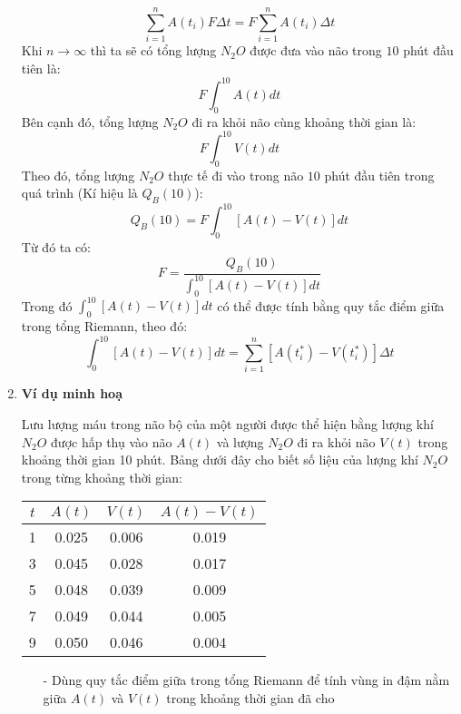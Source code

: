 \documentclass[12pt,a4paper]{article}
\begin{document}
\begin{enumerate}[a/]
\begin{flushleft}
		      $$\sum_{i = 1}^{n} A(t_i)F\Delta t = F \sum_{i = 1}^{n} A(t_i) \Delta t$$
		      Khi $n \to \infty$ thì ta sẽ có tổng lượng $N_2O$ được đưa vào não trong $10$ phút đầu tiên là:
		      $$F \int_{0}^{10} A(t)dt$$
		      Bên cạnh đó, tổng lượng $N_2O$ đi ra khỏi não cùng khoảng thời gian là:
		      $$F \int_{0}^{10} V(t)dt$$
		      Theo đó, tổng lượng $N_2O$ thực tế đi vào trong não $10$ phút đầu tiên trong quá trình (Kí hiệu là $Q_B(10)$):
		      $$Q_B(10)=F\int_{0}^{10}\left[A(t)-V(t)\right]dt$$
		      Từ đó ta có:
		      $$F=\frac{Q_B(10)}{\displaystyle \int_{0}^{10}\left[A(t) - V(t)\right]dt}$$
		      Trong đó $\displaystyle \int_{0}^{10}\left[A(t) - V(t)\right]dt$ có thể được tính bằng quy tắc điểm giữa trong tổng Riemann, theo đó:
		      $$\displaystyle \int_{0}^{10}\left[A(t) - V(t)\right]dt = \sum_{i = 1}^{n} \left[A(t_i^*)-V(t_i^*)\right] \Delta t$$
	      \end{flushleft}
	\item \textbf{Ví dụ minh hoạ}
	      \begin{flushleft}
		      Lưu lượng máu trong não bộ của một người được thể hiện bằng lượng khí $N_2O$ được hấp thụ vào não $A(t)$ và lượng $N_2O$ đi ra khỏi não $V(t)$ trong khoảng thời gian 10 phút.
		      Bảng dưới đây cho biết số liệu của lượng khí $N_2O$ trong từng khoảng thời gian:
	      \end{flushleft}
	      \begin{table}[H]
		      \centering
		      \def\arraystretch{1.2}
		      \begin{tabular}{|c|c|c|c|}
			      \hline
			      $t$ & $A(t)$ & $V(t)$ & $A(t) - V(t)$ \\
			      \hline
			      1   & 0.025  & 0.006  & 0.019         \\
			      \hline
			      3   & 0.045  & 0.028  & 0.017         \\
			      \hline
			      5   & 0.048  & 0.039  & 0.009         \\
			      \hline
			      7   & 0.049  & 0.044  & 0.005         \\
			      \hline
			      9   & 0.050  & 0.046  & 0.004         \\
			      \hline
		      \end{tabular}
	      \end{table}
	      \begin{itemize}
		      \item[-] Dùng quy tắc điểm giữa trong tổng Riemann để tính vùng in đậm nằm giữa $A(t)$ và $V(t)$ trong khoảng thời gian đã cho

\end{itemize}
\end{enumerate}
\end{document}
